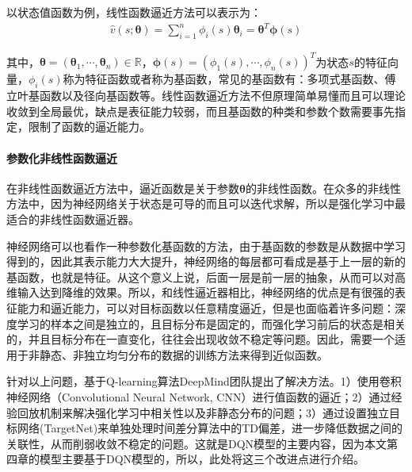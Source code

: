 以状态值函数为例，线性函数逼近方法可以表示为：
\begin{equation}
\begin{aligned}
\hat{v}(s;\bm{\theta})=\sum^{n}_{i=1}\phi_{i}(s) \bm{\theta}_{i}=\bm{\theta }^{T} \bm{\phi}(s)
\end{aligned}
\end{equation}

其中，$\bm{\theta}=(\bm{\theta}_{1},\cdots,\bm{\theta}_{n}) \in \mathbb{R}$，$\bm{\phi}(s)=(\phi_{1}(s),\cdots,\phi_{n}(s))^{T}$为状态$s$的特征向量，$\phi_{i}(s)$称为特征函数或者称为基函数，常见的基函数有：多项式基函数、傅立叶基函数以及径向基函数等。线性函数逼近方法不但原理简单易懂而且可以理论收敛到全局最优，缺点是表征能力较弱，而且基函数的种类和参数个数需要事先指定，限制了函数的逼近能力。


\paragraph{参数化非线性函数逼近}
在非线性函数逼近方法中，逼近函数是关于参数$\bm{\theta}$的非线性函数。在众多的非线性方法中，因为神经网络关于状态是可导的而且可以迭代求解，所以是强化学习中最适合的非线性函数逼近器。

神经网络可以也看作一种参数化基函数的方法，由于基函数的参数是从数据中学习得到的，因此其表示能力大大提升，神经网络的每层都可看成是基于上一层的新的基函数，也就是特征。从这个意义上说，后面一层是前一层的抽象，从而可以对高维输入达到降维的效果。所以，和线性逼近器相比，神经网络的优点是有很强的表征能力和逼近能力，可以对目标函数以任意精度逼近，但是也面临着许多问题：深度学习的样本之间是独立的，且目标分布是固定的，而强化学习前后的状态是相关的，并且目标分布在一直变化，往往会出现收敛不稳定等问题。因此，需要一个适用于非静态、非独立均匀分布的数据的训练方法来得到近似函数。

针对以上问题，基于Q-learning算法DeepMind团队提出了解决方法。1）使用卷积神经网络（Convolutional Neural Network, CNN）进行值函数的逼近；2）通过经验回放机制来解决强化学习中相关性以及非静态分布的问题；3）通过设置独立目标网络(TargetNet)来单独处理时间差分算法中的TD偏差，进一步降低数据之间的关联性，从而削弱收敛不稳定的问题。这就是DQN模型的主要内容，因为本文第四章的模型主要基于DQN模型的，所以，此处将这三个改进点进行介绍。

